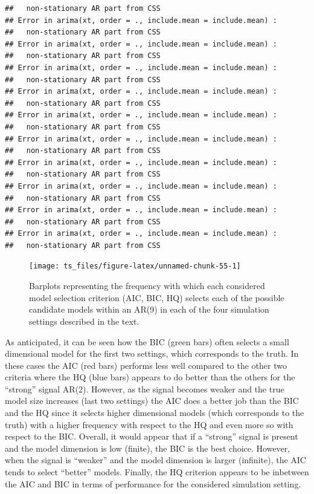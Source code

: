 \documentclass[]{book}
\theoremstyle{definition}
\theoremstyle{definition}
\theoremstyle{definition}
\theoremstyle{remark}
\begin{document}
\begin{verbatim}
##   non-stationary AR part from CSS
## Error in arima(xt, order = ., include.mean = include.mean) : 
##   non-stationary AR part from CSS
## Error in arima(xt, order = ., include.mean = include.mean) : 
##   non-stationary AR part from CSS
## Error in arima(xt, order = ., include.mean = include.mean) : 
##   non-stationary AR part from CSS
## Error in arima(xt, order = ., include.mean = include.mean) : 
##   non-stationary AR part from CSS
## Error in arima(xt, order = ., include.mean = include.mean) : 
##   non-stationary AR part from CSS
## Error in arima(xt, order = ., include.mean = include.mean) : 
##   non-stationary AR part from CSS
## Error in arima(xt, order = ., include.mean = include.mean) : 
##   non-stationary AR part from CSS
## Error in arima(xt, order = ., include.mean = include.mean) : 
##   non-stationary AR part from CSS
## Error in arima(xt, order = ., include.mean = include.mean) : 
##   non-stationary AR part from CSS
## Error in arima(xt, order = ., include.mean = include.mean) : 
##   non-stationary AR part from CSS
\end{verbatim}

\begin{figure}

{\centering \texttt{[image: ts\_files/figure-latex/unnamed-chunk-55-1]} 

}

\caption{Barplots representing the frequency with which each considered model selection criterion (AIC, BIC, HQ) selects each of the possible candidate models within an AR(9) in each of the four simulation settings described in the text.}\label{fig:unnamed-chunk-55}
\end{figure}

As anticipated, it can be seen how the BIC (green bars) often selects a
small dimensional model for the first two settings, which corresponds to
the truth. In these cases the AIC (red bars) performs less well compared
to the other two criteria where the HQ (blue bars) appears to do better
than the others for the ``strong'' signal AR(2). However, as the signal
becomes weaker and the true model size increases (last two settings) the
AIC does a better job than the BIC and the HQ since it selects higher
dimensional models (which corresponds to the truth) with a higher
frequency with respect to the HQ and even more so with respect to the
BIC. Overall, it would appear that if a ``strong'' signal is present and
the model dimension is low (finite), the BIC is the best choice.
However, when the signal is ``weaker'' and the model dimension is larger
(infinite), the AIC tends to select ``better'' models. Finally, the HQ
criterion appears to be inbetween the AIC and BIC in terms of
performance for the considered simulation setting.
\end{document}
